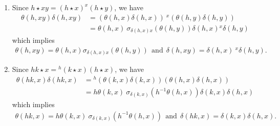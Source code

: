\documentclass[10 pt,oneside,reqno,a4paper]{amsart}
\numberwithin{equation}{section}
\begin{document}
\begin{enumerate}


\item Since $h \star xy= (h \star x) ^x(h \star y)$, we have 
\begin{align*}
    \theta(h,xy) \delta(h,xy) &= (\theta(h,x)\delta(h,x)) ~{^x(\theta(h,y) \delta(h,y))} \\
    &= \theta(h,x) ~{\sigma_{\delta(h,x)x}(\theta(h,y))} \delta(h,x) {^x\delta(h,y)}
\end{align*}
which implies 
\begin{align}
    \theta(h,xy)=\theta(h,x) \sigma_{\delta(h,x)x}(\theta(h,y)) ~~\text{and}~~ \delta(h,xy)= \delta(h,x) ~{^x\delta(h,y)}.
\end{align}


\item Since $hk \star x = {^h(k \star x)} (h \star x)$, we have 
\begin{align*}
    \theta(hk,x)\delta(hk,x) &= {^h(\theta(k,x)\delta(k,x))} (\theta(h,x)\delta(h,x)) \\
    &= h\theta(k,x) ~{\sigma_{\delta(k,x)}(h^{-1}\theta(h,x))} \delta(k,x) \delta(h,x)
\end{align*}
which implies 
\begin{align}
    \theta(hk,x)=  h\theta(k,x) ~{\sigma_{\delta(k,x)}(h^{-1}\theta(h,x))} ~~\text{and}~~ \delta(hk,x)= \delta(k,x) \delta(h,x).
\end{align}



\end{enumerate}
\end{document}
